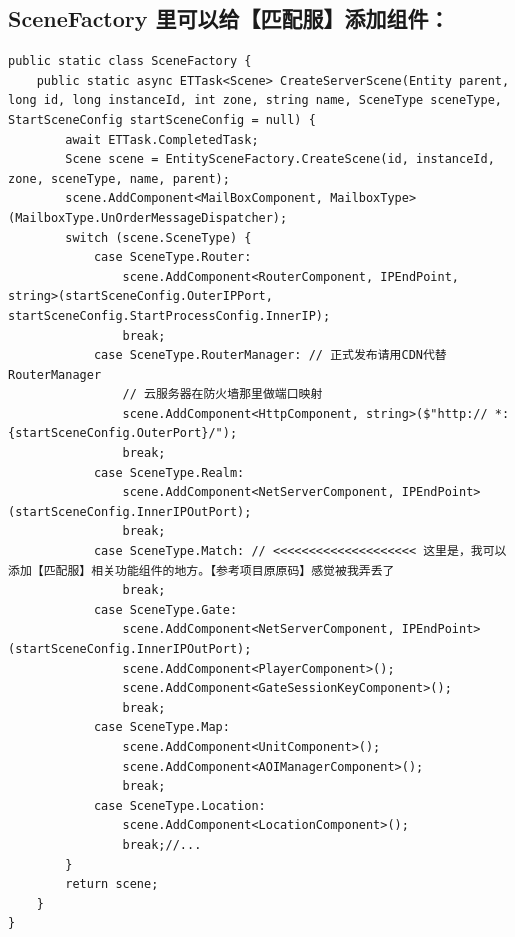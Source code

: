 \documentclass[9pt, b5paper]{article}
\begin{document}
\subsection{SceneFactory 里可以给【匹配服】添加组件：}
\label{sec-7-13}
\begin{verbatim}
public static class SceneFactory {
    public static async ETTask<Scene> CreateServerScene(Entity parent, long id, long instanceId, int zone, string name, SceneType sceneType, StartSceneConfig startSceneConfig = null) {
        await ETTask.CompletedTask;
        Scene scene = EntitySceneFactory.CreateScene(id, instanceId, zone, sceneType, name, parent);
        scene.AddComponent<MailBoxComponent, MailboxType>(MailboxType.UnOrderMessageDispatcher);
        switch (scene.SceneType) {
            case SceneType.Router:
                scene.AddComponent<RouterComponent, IPEndPoint, string>(startSceneConfig.OuterIPPort, startSceneConfig.StartProcessConfig.InnerIP);
                break;
            case SceneType.RouterManager: // 正式发布请用CDN代替RouterManager
                // 云服务器在防火墙那里做端口映射
                scene.AddComponent<HttpComponent, string>($"http:// *:{startSceneConfig.OuterPort}/");
                break;
            case SceneType.Realm:
                scene.AddComponent<NetServerComponent, IPEndPoint>(startSceneConfig.InnerIPOutPort);
                break;
            case SceneType.Match: // <<<<<<<<<<<<<<<<<<<< 这里是，我可以添加【匹配服】相关功能组件的地方。【参考项目原原码】感觉被我弄丢了
                break;
            case SceneType.Gate:
                scene.AddComponent<NetServerComponent, IPEndPoint>(startSceneConfig.InnerIPOutPort);
                scene.AddComponent<PlayerComponent>();
                scene.AddComponent<GateSessionKeyComponent>();
                break;
            case SceneType.Map:
                scene.AddComponent<UnitComponent>();
                scene.AddComponent<AOIManagerComponent>();
                break;
            case SceneType.Location:
                scene.AddComponent<LocationComponent>();
                break;//...
        }
        return scene;
    }
}
\end{verbatim}
\end{document}
